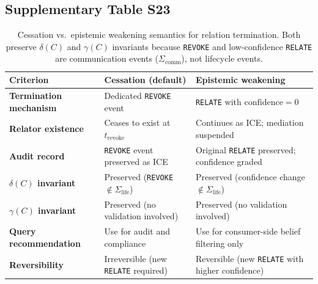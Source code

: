 \subsection{Supplementary Table S23}\label{tab:S23}
\begin{table}[htbp]
\centering
\small
\caption{Cessation vs.~epistemic weakening semantics for relation termination. Both preserve $\delta(C)$ and $\gamma(C)$ invariants because \texttt{REVOKE} and low-confidence \texttt{RELATE} are communication events ($\Sigma_{\text{comm}}$), not lifecycle events.}
\label{tab:cessation-vs-weakening}
\begin{tabular}{@{}p{2.8cm}p{4.8cm}p{4.8cm}@{}}
\toprule
\textbf{Criterion} & \textbf{Cessation (default)} & \textbf{Epistemic weakening} \\
\midrule
\textbf{Termination mechanism} & Dedicated \texttt{REVOKE} event & \texttt{RELATE} with $\text{confidence}=0$ \\
\textbf{Relator existence} & Ceases to exist at $t_{\text{revoke}}$ & Continues as ICE; mediation suspended \\
\textbf{Audit record} & \texttt{REVOKE} event preserved as ICE & Original \texttt{RELATE} preserved; confidence graded \\
\textbf{$\delta(C)$ invariant} & Preserved (\texttt{REVOKE} $\notin \Sigma_{\text{life}}$) & Preserved (confidence change $\notin \Sigma_{\text{life}}$) \\
\textbf{$\gamma(C)$ invariant} & Preserved (no validation involved) & Preserved (no validation involved) \\
\textbf{Query recommendation} & Use for audit and compliance & Use for consumer-side belief filtering only \\
\textbf{Reversibility} & Irreversible (new \texttt{RELATE} required) & Reversible (new \texttt{RELATE} with higher confidence) \\
\bottomrule
\end{tabular}
\end{table}

